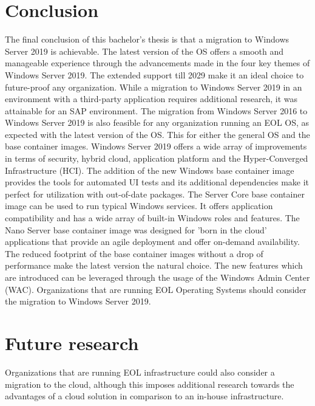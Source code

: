\documentclass[a0,portrait]{a0poster}
\begin{document}
\begin{multicols}{2}
\section*{Conclusion}
\color{black}
The final conclusion of this bachelor's thesis is that a migration to Windows Server 2019 is achievable.
The latest version of the OS offers a smooth and manageable experience through the advancements made in the four key themes of Windows Server 2019. 
The extended support till 2029 make it an ideal choice to future-proof any organization. 
While a migration to Windows Server 2019 in an environment with a third-party application requires additional research, it was attainable for an SAP environment. 
The migration from Windows Server 2016 to Windows Server 2019 is also feasible for any organization running an EOL OS, as expected with the latest version of the OS.
This for either the general OS and the base container images.
Windows Server 2019 offers a wide array of improvements in terms of security, hybrid cloud, application platform and the Hyper-Converged Infrastructure (HCI).
The addition of the new Windows base container image provides the tools for automated UI tests and its additional dependencies make it perfect for utilization with out-of-date packages. 
The Server Core base container image can be used to run typical Windows services. 
It offers application compatibility and has a wide array of built-in Windows roles and features. 
The Nano Server base container image was designed for 'born in the cloud' applications that provide an agile deployment and offer on-demand availability. 
The reduced footprint of the base container images without a drop of performance make the latest version the natural choice. 
The new features which are introduced can be leveraged through the usage of the Windows Admin Center (WAC).
Organizations that are running EOL Operating Systems should consider the migration to Windows Server 2019.

\color{HoGentAccent1} 
\section*{Future research}
\color{black}
Organizations that are running EOL infrastructure could also consider a migration to the cloud, although this imposes additional research towards the advantages of a cloud solution in comparison to an in-house infrastructure.




\end{multicols}
\end{document}

